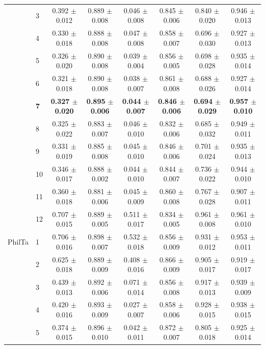 \begin{longtable}{llcccccc}
 & 3 & 0.392 $\pm$ 0.012 & 0.889 $\pm$ 0.008 & 0.046 $\pm$ 0.008 & 0.845 $\pm$ 0.006 & 0.840 $\pm$ 0.020 & 0.946 $\pm$ 0.013 \\
 & 4 & 0.330 $\pm$ 0.018 & 0.888 $\pm$ 0.008 & 0.047 $\pm$ 0.008 & 0.858 $\pm$ 0.007 & 0.696 $\pm$ 0.030 & 0.927 $\pm$ 0.013 \\
 & 5 & 0.326 $\pm$ 0.020 & 0.890 $\pm$ 0.008 & 0.039 $\pm$ 0.004 & 0.856 $\pm$ 0.005 & 0.698 $\pm$ 0.028 & 0.935 $\pm$ 0.014 \\
 & 6 & 0.321 $\pm$ 0.018 & 0.890 $\pm$ 0.008 & 0.038 $\pm$ 0.007 & 0.861 $\pm$ 0.008 & 0.688 $\pm$ 0.026 & 0.927 $\pm$ 0.014 \\
 & \textbf{7} & \textbf{0.327 $\pm$ 0.020} & \textbf{0.895 $\pm$ 0.006} & \textbf{0.044 $\pm$ 0.007} & \textbf{0.846 $\pm$ 0.006} & \textbf{0.694 $\pm$ 0.029} & \textbf{0.957 $\pm$ 0.010} \\
 & 8 & 0.325 $\pm$ 0.022 & 0.883 $\pm$ 0.007 & 0.046 $\pm$ 0.010 & 0.832 $\pm$ 0.006 & 0.685 $\pm$ 0.032 & 0.949 $\pm$ 0.011 \\
 & 9 & 0.331 $\pm$ 0.019 & 0.885 $\pm$ 0.008 & 0.045 $\pm$ 0.010 & 0.846 $\pm$ 0.006 & 0.701 $\pm$ 0.024 & 0.935 $\pm$ 0.013 \\
 & 10 & 0.346 $\pm$ 0.017 & 0.888 $\pm$ 0.002 & 0.044 $\pm$ 0.010 & 0.844 $\pm$ 0.007 & 0.736 $\pm$ 0.022 & 0.944 $\pm$ 0.010 \\
 & 11 & 0.360 $\pm$ 0.018 & 0.881 $\pm$ 0.006 & 0.045 $\pm$ 0.009 & 0.860 $\pm$ 0.008 & 0.767 $\pm$ 0.028 & 0.907 $\pm$ 0.011 \\
 & 12 & 0.707 $\pm$ 0.015 & 0.889 $\pm$ 0.005 & 0.511 $\pm$ 0.017 & 0.834 $\pm$ 0.005 & 0.961 $\pm$ 0.008 & 0.961 $\pm$ 0.010 \\
\midrule
PhilTa & 1 & 0.706 $\pm$ 0.016 & 0.898 $\pm$ 0.007 & 0.532 $\pm$ 0.018 & 0.856 $\pm$ 0.009 & 0.931 $\pm$ 0.012 & 0.953 $\pm$ 0.011 \\
 & 2 & 0.625 $\pm$ 0.018 & 0.889 $\pm$ 0.009 & 0.408 $\pm$ 0.016 & 0.866 $\pm$ 0.009 & 0.905 $\pm$ 0.017 & 0.919 $\pm$ 0.017 \\
 & 3 & 0.439 $\pm$ 0.013 & 0.892 $\pm$ 0.006 & 0.071 $\pm$ 0.014 & 0.856 $\pm$ 0.008 & 0.917 $\pm$ 0.013 & 0.939 $\pm$ 0.009 \\
 & 4 & 0.420 $\pm$ 0.016 & 0.893 $\pm$ 0.009 & 0.027 $\pm$ 0.007 & 0.858 $\pm$ 0.006 & 0.928 $\pm$ 0.015 & 0.938 $\pm$ 0.015 \\
 & 5 & 0.374 $\pm$ 0.015 & 0.896 $\pm$ 0.010 & 0.042 $\pm$ 0.011 & 0.872 $\pm$ 0.007 & 0.805 $\pm$ 0.018 & 0.925 $\pm$ 0.014 \\

\end{longtable}
